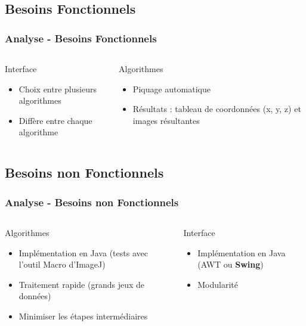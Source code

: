 \documentclass[11pt]{beamer}
\begin{document}
\subsection{Besoins Fonctionnels}
\begin{frame}
\frametitle{Analyse - Besoins Fonctionnels}
	\begin{columns}[t]
		
		\begin{column}{5cm}
			\begin{block}{Interface}
				\begin{itemize}
					\item Choix entre plusieurs algorithmes
					\item Diffère entre chaque algorithme
				\end{itemize}
			\end{block}
		\end{column}
		\begin{column}{5cm}
			\begin{block}{Algorithmes}
				\begin{itemize}
					\item Piquage automatique
					\item Résultats : tableau de coordonnées (x, y, z) et images résultantes
				\end{itemize}
			\end{block}
		\end{column}
	\end{columns}	
\end{frame}

\subsection{Besoins non Fonctionnels}
\begin{frame}
\frametitle{Analyse - Besoins non Fonctionnels}
	\begin{columns}[t]
		\begin{column}{5cm}
			\begin{block}{Algorithmes}
				\begin{itemize}
					\item Implémentation en Java (tests avec l'outil Macro d'ImageJ)
					\item Traitement rapide (grands jeux de données)
					\item Minimiser les étapes intermédiaires
				\end{itemize}
			\end{block}
		\end{column}
		\begin{column}{5cm}
			\begin{block}{Interface}
				\begin{itemize}
					\item Implémentation en Java (AWT ou \textbf{Swing})
					\item Modularité
				\end{itemize}
			\end{block}
		\end{column}
	\end{columns}
\end{frame}
\end{document}
